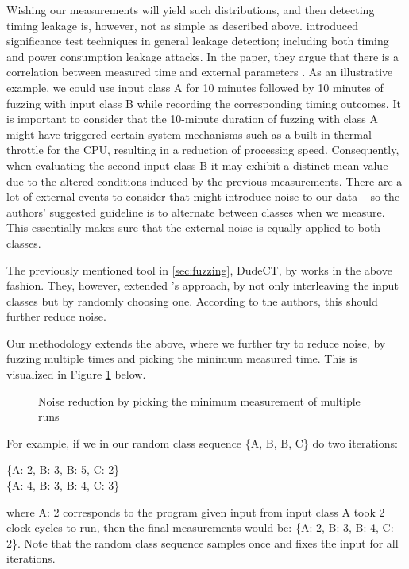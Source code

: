 Wishing our measurements will yield such distributions, and then detecting timing leakage is, however, not as simple as described above. \citeauthor{Coron_2004} introduced significance test techniques in general leakage detection; including both timing and power consumption leakage attacks. In the paper, they argue that there is a correlation between measured time and external parameters \citep{Coron_2004}. As an illustrative example, we could use input class A for 10 minutes followed by 10 minutes of fuzzing with input class B while recording the corresponding timing outcomes. It is important to consider that the 10-minute duration of fuzzing with class A might have triggered certain system mechanisms such as a built-in thermal throttle for the CPU, resulting in a reduction of processing speed. Consequently, when evaluating the second input class B it may exhibit a distinct mean value due to the altered conditions induced by the previous measurements. There are a lot of external events to consider that might introduce noise to our data -- so the authors' suggested guideline is to alternate between classes when we measure. This essentially makes sure that the external noise is equally applied to both classes.

The previously mentioned tool in \ref{sec:fuzzing}, DudeCT, by \citeauthor{dudect} works in the above fashion. They, however, extended \citeauthor{Coron_2004}'s approach, by not only interleaving the input classes but by randomly choosing one. According to the authors, this should further reduce noise.

Our methodology extends the above, where we further try to reduce noise, by fuzzing multiple times and picking the minimum measured time. This is visualized in Figure \ref{fig:noisered} below. 
\begin{figure}[H]
    \centering
    
    \caption{Noise reduction by picking the minimum measurement of multiple runs}
    \label{fig:noisered}
\end{figure}
For example, if we in our random class sequence \{A, B, B, C\} do two iterations:
\begin{center}
    \{A: 2, B: 3, B: 5, C: 2\} \\
    \{A: 4, B: 3, B: 4, C: 3\}
\end{center}
where A: 2 corresponds to the program given input from input class A took 2 clock cycles to run, then the final measurements would be: \{A: 2, B: 3, B: 4, C: 2\}. Note that the random class sequence samples once and fixes the input for all iterations.

